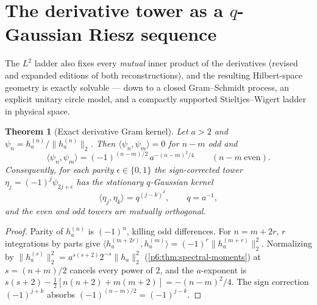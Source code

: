 \documentclass[11pt,oneside]{article}
\numberwithin{equation}{section}
\newtheorem{theorem}{Theorem}[section]
\theoremstyle{definition}
\theoremstyle{remark}
\begin{document}
\section{The derivative tower as a \texorpdfstring{$q$}{q}-Gaussian Riesz sequence}
\label{p6:sec:q-gaussian-tower}

The $L^2$ ladder also fixes every \emph{mutual} inner product of the
derivatives (revised and expanded editions of both reconstructions), and
the resulting Hilbert-space geometry is exactly solvable --- down to a
closed Gram--Schmidt process, an explicit unitary circle model, and a
compactly supported Stieltjes--Wigert ladder in physical space.

\begin{theorem}[Exact derivative Gram kernel]\label{p6:thm:derivative-gram}
Let $a>2$ and $\psi_n=h_a^{(n)}/\|h_a^{(n)}\|_2$.  Then
$\langle\psi_n,\psi_m\rangle=0$ for $n-m$ odd and
\begin{equation}\label{p6:eq:derivative-gram}
 \langle\psi_n,\psi_m\rangle
 =(-1)^{(n-m)/2}\,a^{-(n-m)^2/4}
 \qquad(n-m\ \text{even}).
\end{equation}
Consequently, for each parity $\epsilon\in\{0,1\}$ the sign-corrected tower
$\eta_j=(-1)^j\psi_{2j+\epsilon}$ has the stationary $q$-Gaussian kernel
\begin{equation}\label{p6:eq:q-gaussian-kernel}
 \boxed{\ \langle\eta_j,\eta_k\rangle=q^{(j-k)^2},
 \qquad q=a^{-1},\ }
\end{equation}
and the even and odd towers are mutually orthogonal.
\end{theorem}

\begin{proof}
Parity of $h_a^{(n)}$ is $(-1)^n$, killing odd differences.  For $n=m+2r$,
$r$ integrations by parts give
$\langle h_a^{(m+2r)},h_a^{(m)}\rangle=(-1)^r\|h_a^{(m+r)}\|_2^2$.
Normalizing by $\|h_a^{(s)}\|_2^2=a^{s(s+2)}2^{-s}\|h_a\|_2^2$
(\cref{p6:thm:spectral-moments}) at $s=(n+m)/2$ cancels every power of $2$,
and the $a$-exponent is
$s(s+2)-\tfrac12[n(n+2)+m(m+2)]=-(n-m)^2/4$.  The sign correction
$(-1)^{j+k}$ absorbs $(-1)^{(n-m)/2}=(-1)^{j-k}$.
\end{proof}
\end{document}
